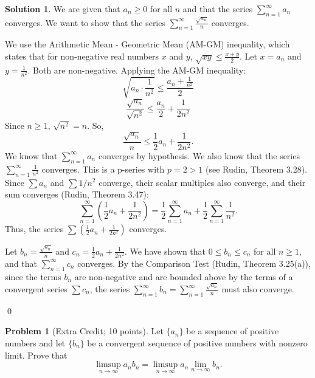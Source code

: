 \documentclass[12pt,oneside]{article}
\theoremstyle{definition}
\newtheorem{problem}{Problem}
\newtheorem*{solution}{Solution} %
\begin{document}
\begin{solution}
We are given that $a_n \ge 0$ for all $n$ and that the series $\sum_{n=1}^{\infty} a_n$ converges.
We want to show that the series $\sum_{n=1}^{\infty} \frac{\sqrt{a_n}}{n}$ converges.

We use the Arithmetic Mean - Geometric Mean (AM-GM) inequality, which states that for non-negative real numbers $x$ and $y$, $\sqrt{xy} \le \frac{x+y}{2}$.
Let $x = a_n$ and $y = \frac{1}{n^2}$. Both are non-negative.
Applying the AM-GM inequality:
\[
\sqrt{a_n \cdot \frac{1}{n^2}} \le \frac{a_n + \frac{1}{n^2}}{2}
\]
\[
\frac{\sqrt{a_n}}{\sqrt{n^2}} \le \frac{a_n}{2} + \frac{1}{2n^2}
\]
Since $n \ge 1$, $\sqrt{n^2} = n$. So,
\[
\frac{\sqrt{a_n}}{n} \le \frac{1}{2} a_n + \frac{1}{2n^2}.
\]
We know that $\sum_{n=1}^{\infty} a_n$ converges by hypothesis.
We also know that the series $\sum_{n=1}^{\infty} \frac{1}{n^2}$ converges. This is a p-series with $p=2 > 1$ (see Rudin, Theorem 3.28).
Since $\sum a_n$ and $\sum 1/n^2$ converge, their scalar multiples also converge, and their sum converges (Rudin, Theorem 3.47):
\[
\sum_{n=1}^{\infty} \left( \frac{1}{2} a_n + \frac{1}{2n^2} \right) = \frac{1}{2} \sum_{n=1}^{\infty} a_n + \frac{1}{2} \sum_{n=1}^{\infty} \frac{1}{n^2}.
\]
Thus, the series $\sum (\frac{1}{2} a_n + \frac{1}{2n^2})$ converges.

Let $b_n = \frac{\sqrt{a_n}}{n}$ and $c_n = \frac{1}{2} a_n + \frac{1}{2n^2}$. We have shown that $0 \le b_n \le c_n$ for all $n \ge 1$, and that $\sum_{n=1}^{\infty} c_n$ converges.
By the Comparison Test (Rudin, Theorem 3.25(a)), since the terms $b_n$ are non-negative and are bounded above by the terms of a convergent series $\sum c_n$, the series $\sum_{n=1}^{\infty} b_n = \sum_{n=1}^{\infty} \frac{\sqrt{a_n}}{n}$ must also converge.
\end{solution}
\qed


\bigskip
\bigskip

\begin{problem}[Extra Credit; 10 points]
Let $\{a_n\}$ be a sequence of positive numbers and let $\{b_n\}$ be a convergent sequence of positive numbers with nonzero limit. 
Prove that
\[
\limsup_{n\rightarrow \infty} a_nb_n = \limsup_{n\rightarrow \infty}a_n \lim_{n\rightarrow \infty}b_n.
\]
\end{problem}
\end{document}
